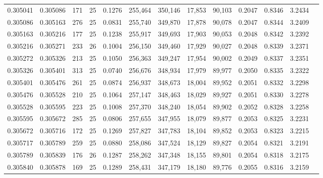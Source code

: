 \begin{tabular}{rrrrrrrrrrrrr}
0.305041 & 0.305086 &   171 &  25 &                                     0.1276 & 255,464 & 350,146 &  17,853 &  90,103 & 0.2047 & 0.8346 & 3.2434 \\
0.305086 & 0.305163 &   276 &  25 &                                     0.0831 & 255,740 & 349,870 &  17,878 &  90,078 & 0.2047 & 0.8344 & 3.2409 \\
0.305163 & 0.305216 &   177 &  25 &                                     0.1238 & 255,917 & 349,693 &  17,903 &  90,053 & 0.2048 & 0.8342 & 3.2392 \\
0.305216 & 0.305271 &   233 &  26 &                                     0.1004 & 256,150 & 349,460 &  17,929 &  90,027 & 0.2048 & 0.8339 & 3.2371 \\
0.305272 & 0.305326 &   213 &  25 &                                     0.1050 & 256,363 & 349,247 &  17,954 &  90,002 & 0.2049 & 0.8337 & 3.2351 \\
0.305326 & 0.305401 &   313 &  25 &                                     0.0740 & 256,676 & 348,934 &  17,979 &  89,977 & 0.2050 & 0.8335 & 3.2322 \\
0.305401 & 0.305476 &   261 &  25 &                                     0.0874 & 256,937 & 348,673 &  18,004 &  89,952 & 0.2051 & 0.8332 & 3.2298 \\
0.305476 & 0.305528 &   210 &  25 &                                     0.1064 & 257,147 & 348,463 &  18,029 &  89,927 & 0.2051 & 0.8330 & 3.2278 \\
0.305528 & 0.305595 &   223 &  25 &                                     0.1008 & 257,370 & 348,240 &  18,054 &  89,902 & 0.2052 & 0.8328 & 3.2258 \\
0.305595 & 0.305672 &   285 &  25 &                                     0.0806 & 257,655 & 347,955 &  18,079 &  89,877 & 0.2053 & 0.8325 & 3.2231 \\
0.305672 & 0.305716 &   172 &  25 &                                     0.1269 & 257,827 & 347,783 &  18,104 &  89,852 & 0.2053 & 0.8323 & 3.2215 \\
0.305717 & 0.305789 &   259 &  25 &                                     0.0880 & 258,086 & 347,524 &  18,129 &  89,827 & 0.2054 & 0.8321 & 3.2191 \\
0.305789 & 0.305839 &   176 &  26 &                                     0.1287 & 258,262 & 347,348 &  18,155 &  89,801 & 0.2054 & 0.8318 & 3.2175 \\
0.305840 & 0.305878 &   169 &  25 &                                     0.1289 & 258,431 & 347,179 &  18,180 &  89,776 & 0.2055 & 0.8316 & 3.2159 \\

\end{tabular}
